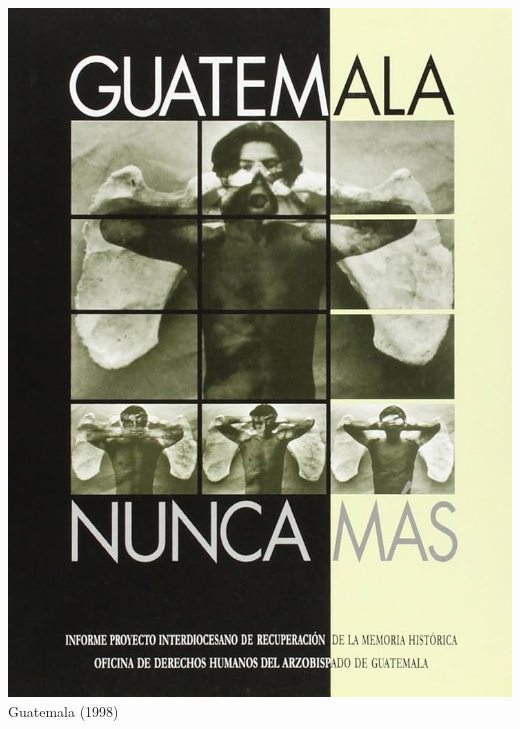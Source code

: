 \documentclass[aspectratio=43]{beamer}
\begin{document}
\begin{frame}
\begin{minipage}{.49\textwidth}
\includegraphics[width = \textwidth]{img/guatemala_nuncamas}\\Guatemala (1998)
\end{minipage}

\end{frame}




\end{document}
